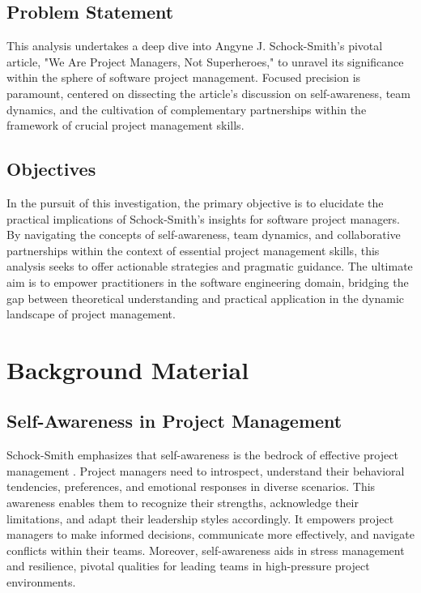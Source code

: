 \documentclass[runningheads]{llncs}
\begin{document}
\subsection{Problem Statement}
This analysis undertakes a deep dive into Angyne J. Schock-Smith's pivotal article, "We Are Project Managers, Not Superheroes," to unravel its significance within the sphere of software project management. Focused precision is paramount, centered on dissecting the article's discussion on self-awareness, team dynamics, and the cultivation of complementary partnerships within the framework of crucial project management skills.

\subsection{Objectives}
In the pursuit of this investigation, the primary objective is to elucidate the practical implications of Schock-Smith's insights for software project managers. By navigating the concepts of self-awareness, team dynamics, and collaborative partnerships within the context of essential project management skills, this analysis seeks to offer actionable strategies and pragmatic guidance. The ultimate aim is to empower practitioners in the software engineering domain, bridging the gap between theoretical understanding and practical application in the dynamic landscape of project management.


\section{Background Material}

\subsection{Self-Awareness in Project Management}
Schock-Smith emphasizes that self-awareness is the bedrock of effective project management \cite{ref_9}. Project managers need to introspect, understand their behavioral tendencies, preferences, and emotional responses in diverse scenarios. This awareness enables them to recognize their strengths, acknowledge their limitations, and adapt their leadership styles accordingly. It empowers project managers to make informed decisions, communicate more effectively, and navigate conflicts within their teams. Moreover, self-awareness aids in stress management and resilience, pivotal qualities for leading teams in high-pressure project environments.
\end{document}
